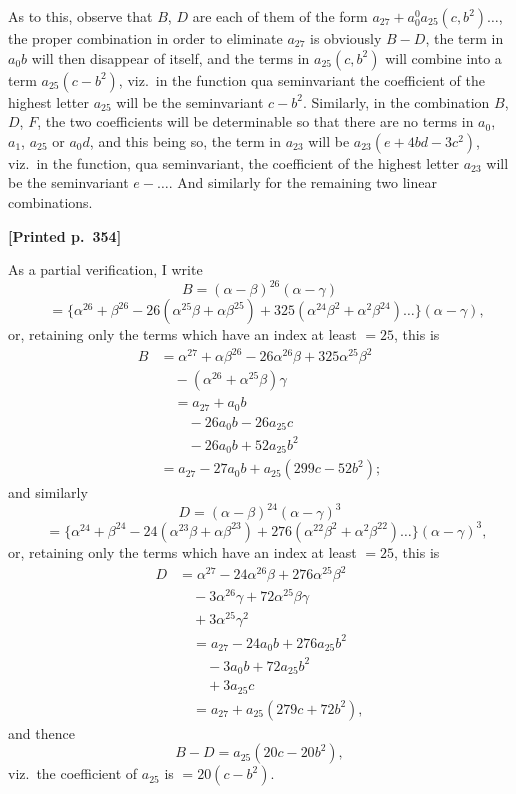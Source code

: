 \documentclass[11pt]{article}
\begin{document}
As to this, observe that $B$, $D$ are each of them of the form $a_{27} + a_{0}^{0} a_{25}(c, b^{2})\dots$, the proper combination in order to eliminate $a_{27}$ is obviously $B - D$, the term in $a_{0}b$ will then disappear of itself, and the terms in $a_{25}(c, b^{2})$ will combine into a term $a_{25}(c - b^{2})$, viz.\ in the function qua seminvariant the coefficient of the highest letter $a_{25}$ will be the seminvariant $c - b^{2}$. Similarly, in the combination $B$, $D$, $F$, the two coefficients will be determinable so that there are no terms in $a_{0}$, $a_{1}$, $a_{25}$ or $a_{0}d$, and this being so, the term in $a_{23}$ will be $a_{23}(e + 4bd - 3c^{2})$, viz.\ in the function, qua seminvariant, the coefficient of the highest letter $a_{23}$ will be the seminvariant $e - \dots$. And similarly for the remaining two linear combinations.

\medskip

\noindent\textbf{[Printed p.~354]}\hfill

\noindent As a partial verification, I write
\[
B = (\alpha - \beta)^{26}(\alpha - \gamma)
\]
\[
\quad = \{\alpha^{26} + \beta^{26} - 26(\alpha^{25}\beta + \alpha\beta^{25}) + 325(\alpha^{24}\beta^{2} + \alpha^{2}\beta^{24})\dots\}(\alpha - \gamma),
\]
or, retaining only the terms which have an index at least $= 25$, this is
\begin{align*}
B &= \alpha^{27} + \alpha\beta^{26} - 26\alpha^{26}\beta + 325\alpha^{25}\beta^{2} \\
   &\quad - (\alpha^{26} + \alpha^{25}\beta)\gamma \\
   &\quad = a_{27} + a_{0}b \\
   &\quad\quad - 26a_{0}b - 26a_{25}c \\
   &\quad\quad - 26a_{0}b + 52a_{25}b^{2} \\
   &= a_{27} - 27a_{0}b + a_{25}(299c - 52b^{2});
\end{align*}
and similarly
\[
D = (\alpha - \beta)^{24}(\alpha - \gamma)^{3}
\]
\[
\quad = \{\alpha^{24} + \beta^{24} - 24(\alpha^{23}\beta + \alpha\beta^{23}) + 276(\alpha^{22}\beta^{2} + \alpha^{2}\beta^{22})\dots\}(\alpha - \gamma)^{3},
\]
or, retaining only the terms which have an index at least $= 25$, this is
\begin{align*}
D &= \alpha^{27} - 24\alpha^{26}\beta + 276\alpha^{25}\beta^{2} \\
   &\quad - 3\alpha^{26}\gamma + 72\alpha^{25}\beta\gamma \\
   &\quad + 3\alpha^{25}\gamma^{2} \\
   &\quad = a_{27} - 24a_{0}b + 276a_{25}b^{2} \\
   &\quad\quad - 3a_{0}b + 72a_{25}b^{2} \\
   &\quad\quad + 3a_{25}c \\
   &\quad = a_{27} + a_{25}(279c + 72b^{2}),
\end{align*}
and thence
\[
B - D = a_{25}(20c - 20b^{2}),
\]
viz.\ the coefficient of $a_{25}$ is $= 20(c - b^{2})$.
\end{document}
